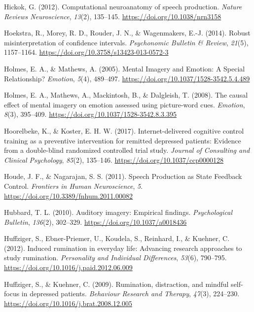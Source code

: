 \documentclass[a4paper,12pt,twoside,openright,oldfontcommands]{memoir}
\begin{document}
\leavevmode\hypertarget{ref-hickok_computational_2012}{}%
Hickok, G. (2012). Computational neuroanatomy of speech production. \emph{Nature Reviews Neuroscience}, \emph{13}(2), 135--145. \url{https://doi.org/10.1038/nrn3158}

\leavevmode\hypertarget{ref-Hoekstra2014}{}%
Hoekstra, R., Morey, R. D., Rouder, J. N., \& Wagenmakers, E.-J. (2014). Robust misinterpretation of confidence intervals. \emph{Psychonomic Bulletin \& Review}, \emph{21}(5), 1157--1164. \url{https://doi.org/10.3758/s13423-013-0572-3}

\leavevmode\hypertarget{ref-holmes_mental_2005}{}%
Holmes, E. A., \& Mathews, A. (2005). Mental Imagery and Emotion: A Special Relationship? \emph{Emotion}, \emph{5}(4), 489--497. \url{https://doi.org/10.1037/1528-3542.5.4.489}

\leavevmode\hypertarget{ref-holmes_causal_2008}{}%
Holmes, E. A., Mathews, A., Mackintosh, B., \& Dalgleish, T. (2008). The causal effect of mental imagery on emotion assessed using picture-word cues. \emph{Emotion}, \emph{8}(3), 395--409. \url{https://doi.org/10.1037/1528-3542.8.3.395}

\leavevmode\hypertarget{ref-hoorelbeke_internet-delivered_2017}{}%
Hoorelbeke, K., \& Koster, E. H. W. (2017). Internet-delivered cognitive control training as a preventive intervention for remitted depressed patients: Evidence from a double-blind randomized controlled trial study. \emph{Journal of Consulting and Clinical Psychology}, \emph{85}(2), 135--146. \url{https://doi.org/10.1037/ccp0000128}

\leavevmode\hypertarget{ref-houde_speech_2011}{}%
Houde, J. F., \& Nagarajan, S. S. (2011). Speech Production as State Feedback Control. \emph{Frontiers in Human Neuroscience}, \emph{5}. \url{https://doi.org/10.3389/fnhum.2011.00082}

\leavevmode\hypertarget{ref-hubbard_auditory_2010}{}%
Hubbard, T. L. (2010). Auditory imagery: Empirical findings. \emph{Psychological Bulletin}, \emph{136}(2), 302--329. \url{https://doi.org/10.1037/a0018436}

\leavevmode\hypertarget{ref-Huffziger2012}{}%
Huffziger, S., Ebner-Priemer, U., Koudela, S., Reinhard, I., \& Kuehner, C. (2012). Induced rumination in everyday life: Advancing research approaches to study rumination. \emph{Personality and Individual Differences}, \emph{53}(6), 790--795. \url{https://doi.org/10.1016/j.paid.2012.06.009}

\leavevmode\hypertarget{ref-Huffziger2009}{}%
Huffziger, S., \& Kuehner, C. (2009). Rumination, distraction, and mindful self-focus in depressed patients. \emph{Behaviour Research and Therapy}, \emph{47}(3), 224--230. \url{https://doi.org/10.1016/j.brat.2008.12.005}
\end{document}
